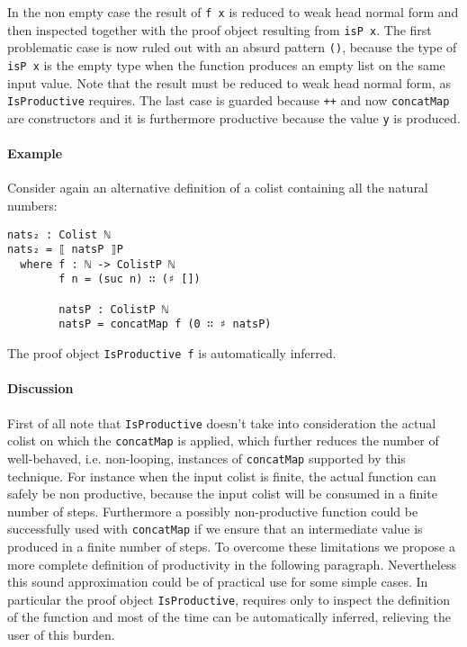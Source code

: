\documentclass[10pt,a4paper]{article}
\begin{document}
In the non empty case the result of \texttt{f x} is reduced to weak head normal form and then inspected together with the proof object resulting from \texttt{isP x}.
The first problematic case is now ruled out with an absurd pattern \texttt{()}, because the type of \texttt{isP x} is the empty type when the function produces an empty list on the same input value. Note that the result must be reduced to weak head normal form, as \texttt{IsProductive} requires.
The last case is guarded because \texttt{++} and now \texttt{concatMap} are constructors and it is furthermore productive because the value \texttt{y} is produced.

\paragraph{Example}
Consider again an alternative definition of a colist containing all the natural numbers:
\begin{verbatim}
nats₂ : Colist ℕ
nats₂ = ⟦ natsP ⟧P
  where f : ℕ -> ColistP ℕ
        f n = (suc n) ∷ (♯ [])

        natsP : ColistP ℕ
        natsP = concatMap f (0 ∷ ♯ natsP)
\end{verbatim}
The proof object \texttt{IsProductive f} is automatically inferred.

\paragraph{Discussion}
First of all note that \texttt{IsProductive} doesn't take into consideration the actual colist on which the \texttt{concatMap} is applied, which further reduces the number of well-behaved, i.e. non-looping, instances of \texttt{concatMap} supported by this technique.
For instance when the input colist is finite, the actual function can safely 	be non productive, because the input colist will be consumed in a finite number of steps. Furthermore a possibly non-productive function could be successfully used with \texttt{concatMap} if we ensure that an intermediate value is produced in a finite number of steps. To overcome these limitations we propose a more complete definition of productivity in the following paragraph.
Nevertheless this sound approximation could be of practical use for some simple cases. In particular the proof object \texttt{IsProductive}, requires only to inspect the definition of the function and most of the time can be automatically inferred, relieving the user of this burden.
\end{document}
